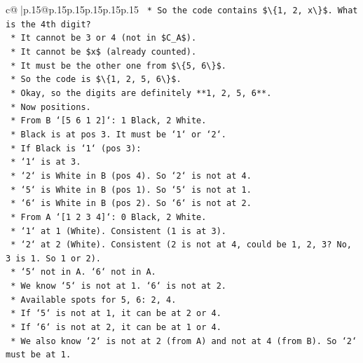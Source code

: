 \documentclass{article}
\begin{document}
{\begin{supertabular}{c@{$\;$}|p{.15\linewidth}@{}p{.15\linewidth}p{.15\linewidth}p{.15\linewidth}p{.15\linewidth}p{.15\linewidth}}
{{{\texttt{        *   So the code contains \$\textbackslash{}\{1, 2, x\textbackslash{}\}\$. What is the 4th digit?} \\
\texttt{        *   It cannot be 3 or 4 (not in \$C\_A\$).} \\
\texttt{        *   It cannot be \$x\$ (already counted).} \\
\texttt{        *   It must be the other one from \$\textbackslash{}\{5, 6\textbackslash{}\}\$.} \\
\texttt{        *   So the code is \$\textbackslash{}\{1, 2, 5, 6\textbackslash{}\}\$.} \\
\texttt{        *   Okay, so the digits are definitely **1, 2, 5, 6**.} \\
\texttt{        *   Now positions.} \\
\texttt{        *   From B `{[}5 6 1 2{]}`: 1 Black, 2 White.} \\
\texttt{            *   Black is at pos 3. It must be `1` or `2`.} \\
\texttt{            *   If Black is `1` (pos 3):} \\
\texttt{                *   `1` is at 3.} \\
\texttt{                *   `2` is White in B (pos 4). So `2` is not at 4.} \\
\texttt{                *   `5` is White in B (pos 1). So `5` is not at 1.} \\
\texttt{                *   `6` is White in B (pos 2). So `6` is not at 2.} \\
\texttt{                *   From A `{[}1 2 3 4{]}`: 0 Black, 2 White.} \\
\texttt{                    *   `1` at 1 (White). Consistent (1 is at 3).} \\
\texttt{                    *   `2` at 2 (White). Consistent (2 is not at 4, could be 1, 2, 3? No, 3 is 1. So 1 or 2).} \\
\texttt{                    *   `5` not in A. `6` not in A.} \\
\texttt{                *   We know `5` is not at 1. `6` is not at 2.} \\
\texttt{                *   Available spots for 5, 6: 2, 4.} \\
\texttt{                *   If `5` is not at 1, it can be at 2 or 4.} \\
\texttt{                *   If `6` is not at 2, it can be at 1 or 4.} \\
\texttt{                *   We also know `2` is not at 2 (from A) and not at 4 (from B). So `2` must be at 1.} \\
}}}
\end{supertabular}}
\end{document}
